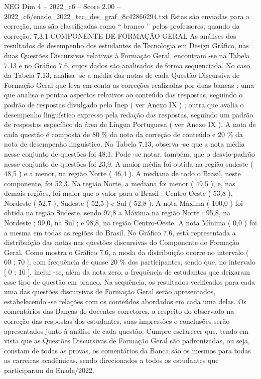 \begin{textsample}{NEG Dim 4 – 2022\_c6 – Score 2.00 – 2022\_c6/enade\_2022\_tec\_des\_graf\_8c42866294.txt}
Estas são enviadas para a correção, mas são classificadas como “ branco ” pelos professores, quando da correção. 7.3.1 COMPONENTE DE FORMAÇÃO GERAL As análises dos resultados de desempenho dos estudantes de Tecnologia em Design Gráfico, nas duas Questões Discursivas relativas à Formação Geral, encontram -se na Tabela 7.13 e no Gráfico 7.6, cujos dados são analisados de forma sequenciada.
No caso da Tabela 7.13, analisa -se a média das notas de cada Questão Discursiva de Formação Geral que leva em conta as correções realizadas por duas bancas : uma que analisa e pontua aspectos relativos ao conteúdo das respostas, seguindo o padrão de respostas divulgado pelo Inep ( ver Anexo IX ) ; outra que avalia o desempenho linguístico expresso pela redação das respostas, seguindo um padrão de respostas específico da área de Língua Portuguesa ( ver Anexo IX ).
A nota de cada questão é composta de 80 \% da nota da correção de conteúdo e 20 \% da nota de desempenho linguístico.
Na Tabela 7.13, observa -se que a nota média nesse conjunto de questões foi 48,1.
Pode -se notar, também, que o desvio-padrão nesse conjunto de questões foi 23,9.
A maior média foi obtida na região sudeste ( 48,5 ) e a menor, na região Norte ( 46,4 ).
A mediana de todo o Brasil, neste componente, foi 52,3.
Na região Norte, a mediana foi menor ( 49,5 ), e, nas demais regiões, foi maior que o valor para o Brasil : Centro-Oeste ( 53,8 ), Nordeste ( 52,7 ), Sudeste ( 52,5 ) e Sul ( 52,8 ).
A nota Máxima ( 100,0 ) foi obtida na região Sudeste, sendo 97,8 a Máxima na região Norte ; 95,8, na Nordeste ; 99,0, na Sul ; e 98,8, na região Centro-Oeste.
A nota Mínima ( 0,0 ) foi a mesma em todas as regiões do Brasil.
No Gráfico 7.6, está representada a distribuição das notas nas questões discursivas do Componente de Formação Geral.
Como mostra o Gráfico 7.6, a moda da distribuição ocorre no intervalo ( 60 ; 70 ], com frequência de quase 20 \% dos participantes, sendo que, no intervalo [ 0 ; 10 ], inclui -se, além da nota zero, a frequência de estudantes que deixaram esse tipo de questão em branco.
Na sequência, os resultados verificados para cada uma das questões discursivas de Formação Geral serão apresentados, estabelecendo -se relações com os conteúdos abordados em cada uma delas.
Os comentários das Bancas de docentes corretores, a respeito do observado na correção das respostas dos estudantes, suas impressões e conclusões serão apresentados junto à análise de cada questão.
Cumpre esclarecer que, tendo em vista que as Questões Discursivas de Formação Geral são padronizadas, ou seja, constam de todas as provas, os comentários da Banca são os mesmos para todas as carreiras acadêmicas, sendo direcionados a todos os estudantes que participaram do Enade/2022.

\end{textsample}
